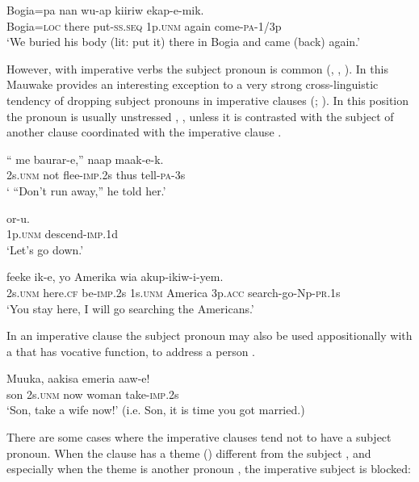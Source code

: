 \ea%
\label{ex:3:x1803}
\gll Bogia=pa nan wu-ap  kiiriw ekap-e-mik. \\
Bogia=\textsc{loc} there put-\textsc{ss}.\textsc{seq} 1p.\textsc{unm} again come-\textsc{pa}-1/3p\\
\glt`We buried his body (lit: put it) there in Bogia and came (back) again.'
\z

However, with imperative verbs the subject pronoun is common (, , ). In this Mauwake provides an interesting exception to a very strong cross-linguistic tendency of dropping subject pronouns in imperative clauses (\citealt[80]{Givon1979}; \citealt[173--174]{SadockEtAl1985}). In this position the pronoun is usually unstressed , , unless it is contrasted with the subject of another clause coordinated with the imperative clause . 

\ea%
\label{ex:3:x1771}
\gll `` me baurar-e,'' naap maak-e-k. \\
2s.\textsc{unm} not flee-\textsc{imp}.2s thus tell-\textsc{pa}-3s\\
\glt` ``Don't run away,'' he told her.'
\z

\ea%
\label{ex:3:x1772}
\gll {} or-u. \\
1p.\textsc{unm} descend-\textsc{imp}.1d\\
\glt`Let's go down.'
\z

\ea%
\label{ex:3:x1780}
\gll {} feeke ik-e, yo Amerika wia akup-ikiw-i-yem.\\
2s.\textsc{unm} here.\textsc{cf} be-\textsc{imp}.2s 1s.\textsc{unm} America 3p.\textsc{acc} search-go-Np-\textsc{pr}.1s\\
\glt`You stay here, I will go searching the Americans.'
\z

In an imperative clause the subject pronoun may also be used appositionally with a  that has vocative function, to address a person . 

\ea%
\label{ex:3:x627}
\gll Muuka,  aakisa emeria aaw-e! \\
son 2s.\textsc{unm} now woman take-\textsc{imp}.2s\\
\glt`Son, take a wife now!' (i.e. Son, it is time you got married.)
\z

There are some cases where the imperative clauses tend not to have a subject pronoun. When the clause has a theme () different from the subject , and especially when the theme is another pronoun , the imperative subject is blocked:

